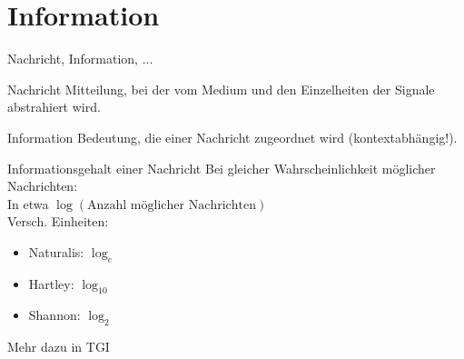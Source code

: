 
\section{Information}

\begin{frame}{Nachricht, Information, ...}
	
	\begin{block}{Nachricht}
		      Mitteilung, bei der vom Medium und den Einzelheiten der Signale abstrahiert wird.
	\end{block}
	
	\pause
	\begin{block}{Information}
		      Bedeutung, die einer Nachricht zugeordnet wird (kontextabhängig!).
	\end{block}
	
	\pause
	\begin{block}{Informationsgehalt einer Nachricht}
		Bei gleicher Wahrscheinlichkeit möglicher Nachrichten: \\ \quad In etwa \quad $\log(\text{Anzahl möglicher Nachrichten})$ \\
			Versch. Einheiten: \\ \vspace{-.2\baselineskip}
			\begin{itemize}
				\item Naturalis: $\log_e$ 
				\item Hartley: $\log_{10}$ 
				\item Shannon: $\log_2$
			\end{itemize}
		\impl Mehr dazu in TGI
	\end{block}

\end{frame}



